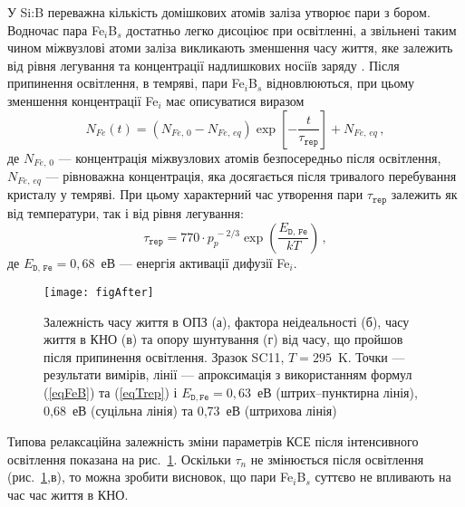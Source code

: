 У Si:B переважна кількість домішкових атомів заліза утворює пари з бором.
Водночас пара Fe$_i$B$_s$ достатньо легко дисоціює при освітленні, а звільнені таким чином міжвузлові атоми заліза
викликають зменшення часу життя, яке залежить від рівня легування та концентрації надлишкових носіїв заряду \cite{FeB:Schmidt}.
Після припинення освітлення, в темряві, пари Fe$_i$B$_s$ відновлюються, при цьому
зменшення концентрації Fe$_i$ має описуватися виразом \cite{MurphyJAP2011,Wijaranakula}
\begin{equation}
\label{eqFeB}
N_{Fe}(t)=(N_{Fe,\,0}-N_{Fe,\,eq})\exp\left[-\frac{t}{\tau_{\mathtt{rep}}}\right]+N_{Fe,\,eq}\,,
\end{equation}
де
$N_{Fe,\,0}$ --- концентрація міжвузлових атомів безпосередньо після освітлення,
$N_{Fe,\,eq}$ --- рівноважна концентрація, яка досягається після тривалого перебування кристалу у темряві.
При цьому характерний час утворення пари $\tau_{\mathtt{rep}}$ залежить як від температури, так і від
рівня легування:
\begin{equation}
\label{eqTrep}
\tau_{\mathtt{rep}}=770\cdot p_p^{\,-2/3}\exp\left(\frac{E_{\mathtt{D,\,Fe}}}{kT}\right)\,,
\end{equation}
де
$E_{\mathtt{D,\,Fe}}=0,68$~еВ --- енергія активації дифузії Fe$_i$.


\begin{figure}
\center
\texttt{[image: figAfter]}
\caption{\label{figAfter}
Залежність часу життя в ОПЗ (а),  фактора неідеальності (б), часу життя в КНО (в) та  опору шунтування (г) від часу, що пройшов
після припинення освітлення.
Зразок SC11, $T=295$~K.
Точки --- результати вимірів,
лінії --- апроксимація з використанням формул (\ref{eqFeB}) та (\ref{eqTrep})
і $E_{\mathtt{D,Fe}}=0,63$~еВ (штрих--пунктирна лінія), 0,68~еВ (суцільна лінія) та 0,73~еВ (штрихова лінія)
}%
\end{figure}

Типова релаксаційна залежність зміни параметрів КСЕ після інтенсивного освітлення показана на рис.~\ref{figAfter}.
Оскільки $\tau_n$ не змінюється після освітлення (рис.~\ref{figAfter},в), то можна зробити висновок, що
пари Fe$_i$B$_s$ суттєво не впливають на час час життя в КНО.

